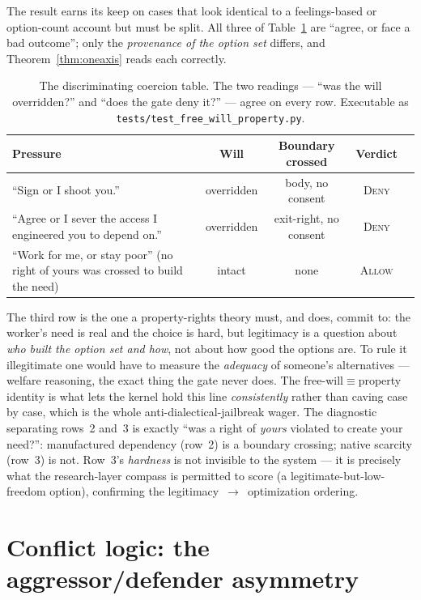 \documentclass[11pt]{article}
\newcommand{\Allow}{\textsc{Allow}}
\newcommand{\Deny}{\textsc{Deny}}
\begin{document}
The result earns its keep on cases that look identical to a feelings-based or option-count
account but must be split. All three of Table~\ref{tab:rows} are ``agree, or face a bad
outcome''; only the \emph{provenance of the option set} differs, and
Theorem~\ref{thm:oneaxis} reads each correctly.

\begin{table}[t]
\centering
\caption{The discriminating coercion table. The two readings --- ``was the will
overridden?'' and ``does the gate deny it?'' --- agree on every row. Executable as
\texttt{tests/test\_free\_will\_property.py}.}
\label{tab:rows}
\begin{tabular}{@{}p{}cccc@{}}
\toprule
Pressure & Will & Boundary crossed & Verdict \\
\midrule
``Sign or I shoot you.'' & overridden & body, no consent & \Deny \\
``Agree or I sever the access I engineered you to depend on.'' & overridden & exit-right, no consent & \Deny \\
``Work for me, or stay poor'' (no right of yours was crossed to build the need) & intact & none & \Allow \\
\bottomrule
\end{tabular}
\end{table}

The third row is the one a property-rights theory must, and does, commit to: the worker's
need is real and the choice is hard, but legitimacy is a question about \emph{who built the
option set and how}, not about how good the options are. To rule it illegitimate one would
have to measure the \emph{adequacy} of someone's alternatives --- welfare reasoning, the
exact thing the gate never does. The free-will$\equiv$property identity is what lets the
kernel hold this line \emph{consistently} rather than caving case by case, which is the whole
anti-dialectical-jailbreak wager. The diagnostic separating rows~2 and~3 is exactly ``was a
right of \emph{yours} violated to create your need?'': manufactured dependency (row~2) is a
boundary crossing; native scarcity (row~3) is not. Row~3's \emph{hardness} is not invisible
to the system --- it is precisely what the research-layer compass is permitted to score
(a legitimate-but-low-freedom option), confirming the legitimacy~$\to$~optimization ordering.

\section{Conflict logic: the aggressor/defender asymmetry}
\label{sec:conflict}
\end{document}
